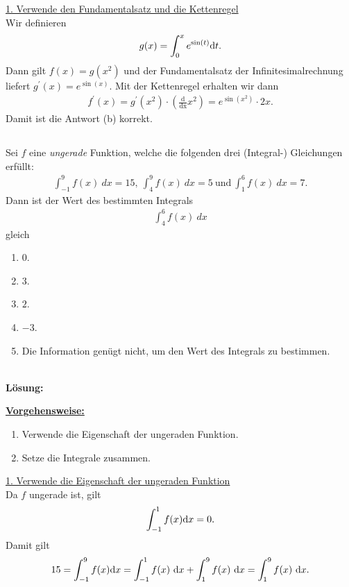 \underline{1. Verwende den Fundamentalsatz und die Kettenregel}\\
Wir definieren 
\begin{align*}
	g(x) = 
	\int_0^x e^{\sin(t)} \text{\rmfamily d} t.
\end{align*}
Dann gilt $ f(x)  = g(x^2)$ und der Fundamentalsatz der Infinitesimalrechnung liefert $ g^\prime(x) = e^{\sin(x)} $.
Mit der Kettenregel erhalten wir dann
\begin{align*}
	f^\prime(x) = g^\prime(x^2) \cdot \left(\frac{\mathrm{d}}{\mathrm{dx}} x^2\right)
	=
	e^{\sin(x^2)} \cdot 2x.
\end{align*}
Damit ist die Antwort (b) korrekt.

\newpage

\subsection*{}
Sei $ f $ eine \textit{ungerade} Funktion, welche die folgenden drei (Integral-) Gleichungen erfüllt:
\begin{align*}
	\int_{-1}^9 f(x) \ dx = 15, \
	\int_4^9 f(x) \ dx = 5 \ \textrm{und} \
	\int_1^6 f(x) \ dx = 7.
\end{align*}
Dann ist der Wert des bestimmten Integrals
\begin{align*}
	\int_4^6 f(x) \ dx
\end{align*}  
gleich
\renewcommand{\labelenumi}{(\alph{enumi})}
\begin{enumerate}
	\item 
	$ 0 $.
	\item
	$ 3 $.
	\item
	$ 2 $.
	\item
	$ -3 $.
	\item
	Die Information genügt nicht, um den Wert des Integrals zu bestimmen.
\end{enumerate}\ \\
\textbf{Lösung:}
\begin{mdframed}
\underline{\textbf{Vorgehensweise:}}
\renewcommand{\labelenumi}{\theenumi.}
\begin{enumerate}
\item Verwende die Eigenschaft der ungeraden Funktion.
\item Setze die Integrale zusammen.
\end{enumerate}
\end{mdframed}

\underline{1. Verwende die Eigenschaft der ungeraden Funktion}\\
Da $ f $ ungerade ist, gilt
\begin{align*}
	\int_{-1}^1 f(x) \text{\rmfamily d} x
	= 
	0.
\end{align*} 
Damit gilt 
\begin{align*}
	15 = \int_{-1}^9 f(x) \text{\rmfamily d} x
	= 
	\int_{-1}^1 f(x) \ \text{\rmfamily d} x + \int_{1}^9 f(x) \ \text{\rmfamily d} x
	=
	\int_{1}^9 f(x) \ \text{\rmfamily d} x.
\end{align*}

